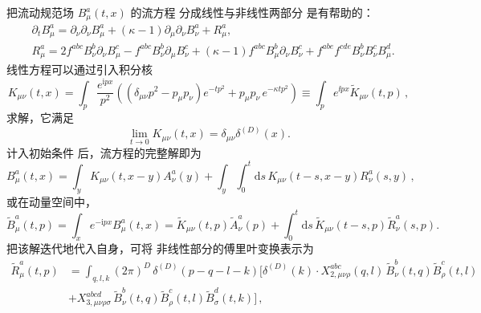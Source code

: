 把流动规范场 $B_\mu^a(t,x)$ 的流方程  分成线性与非线性两部分
是有帮助的：
\begin{equation}
  \begin{split}
  &\partial_t B_\mu^a = \partial_\nu \partial_\nu B_\mu^a + (\kappa - 1)
  \partial_\mu \partial_\nu B_\nu^a + R_\mu^a, \\ &R_\mu^a = 2 f^{abc}
  B_\nu^b \partial_\nu B_\mu^c - f^{abc} B_\nu^b \partial_\mu B_\nu^c +
  (\kappa - 1) f^{abc} B_\mu^b \partial_\nu B_\nu^c + f^{abe} f^{cde}
  B_\nu^b B_\nu^c B_\mu^d.
  \label{eq:flowsep}
  \end{split}
\end{equation}
线性方程可以通过引入积分核
\begin{equation}
  K_{\mu \nu} (t,x) = \int_p \frac{e^{\mathrm{i}px}}{p^2} \left( \left(
  \delta_{\mu \nu} p^2 - p_\mu p_\nu \right) e^{-tp^2} + p_\mu p_\nu \,
  e^{-\kappa tp^2} \right) \equiv \int_p e^{\ii px}\widetilde K_{\mu\nu}(t,p)\,,
  \label{eq:kmunu}
\end{equation}
求解，它满足
\begin{equation}
  \lim_{t \to 0} K_{\mu\nu}(t,x) = \delta_{\mu\nu} \delta^{(D)}(x).
\end{equation}
计入初始条件  后，流方程的完整解即为
\begin{equation}
  B_\mu^a (t,x) = \int_y K_{\mu \nu}(t,x-y) A_{\nu}^a(y)+ \int_y
  \int_0^t \mathrm{d}s \, K_{\mu \nu}(t-s,x-y) R_\nu^a(s,y)\,,
\end{equation}
或在动量空间中，
\begin{equation}
  \widetilde{B}_\mu^a(t,p)= \int_x e^{-\mathrm{i}px} B_\mu^a(t,x)=
  \widetilde{K}_{\mu \nu}(t,p) \widetilde{A}_\nu^a(p)+ \int_0^t
  \mathrm{d}s \, \widetilde{K}_{\mu \nu}(t-s,p)
  \widetilde{R}_\nu^a(s,p).
  \label{eq:gluon_solution_momentum}
\end{equation}
把该解迭代地代入自身，可将  非线性部分的傅里叶变换表示为
\begin{equation}
  \begin{split}
  \widetilde{R}_\mu^a(t,p) &=
  \int_{q,l,k} (2 \pi)^D \, \delta^{(D)}(p-q-l-k)\bigg[
   \delta^{(D)}(k)\cdot X_{2,\mu\nu\rho}^{abc}(q,l)\, \widetilde{B}_{\nu}^{b}(t,q)
      \widetilde{B}_{\rho}^{c}(t,l)\\&
  +
   X_{3,\mu\nu\rho\sigma}^{abcd}\, \widetilde{B}_{\nu}^{b}(t,q)
      \widetilde{B}_{\rho}^{c}(t,l)
      \widetilde{B}_{\sigma}^{d}(t,k)\bigg]\,,
  \end{split}
\end{equation}
